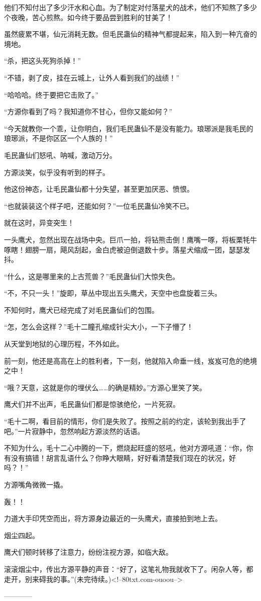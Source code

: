 \begin{this_body}
他们不知付出了多少汗水和心血。为了制定对付落星犬的战术，他们不知熬了多少个夜晚，苦心煎熬。如今终于要品尝到胜利的甘美了！

虽然疲累不堪，仙元消耗无数。但毛民蛊仙的精神气都提起来，陷入到一种亢奋的境地。

“杀，把这头死狗杀掉！”

“不错，剥了皮，挂在云城上，让外人看到我们的战绩！”

“哈哈哈。终于要把它击败了。”

“方源你看到了吗？我知道你不甘心，但你又能如何？”

“今天就教你一个乖，让你明白，我们毛民蛊仙不是没有能力。琅琊派是我毛民的琅琊派，不是你区区一个人族的！”

毛民蛊仙们怒吼、呐喊，激动万分。

方源淡笑，似乎没有听到的样子。

他这份神态，让毛民蛊仙都十分失望，甚至更加厌恶、愤恨。

“也就装装这个样子吧，还能如何？”一位毛民蛊仙冷笑不已。

就在这时，异变突生！

一头鹰犬，忽然出现在战场中央。巨爪一拍，将钻熊击倒！鹰嘴一啄，将板栗牦牛啄瞎！翅膀一扇，飓风刮起，金白虎被迫倒退数十步。落星犬缩成一团，瑟瑟发抖。

“什么，这是哪里来的上古荒兽？”毛民蛊仙们大惊失色。

“不，不只一头！”旋即，草丛中现出五头鹰犬，天空中也盘旋着三头。

不知何时，鹰犬已经完成了对毛民蛊仙们的包围。

“怎，怎么会这样？”毛十二瞳孔缩成针尖大小，一下子懵了！

从天堂到地狱的心理历程，不外如此。

前一刻，他还是高高在上的胜利者，下一刻，他就陷入命垂一线，岌岌可危的绝境之中！

“哦？天意，这就是你的埋伏么……的确是精妙。”方源心里笑了笑。

鹰犬们并不出声，毛民蛊仙们都是惊骇绝伦，一片死寂。

“毛十二啊，看目前的情形，你们是失败了。按照之前的约定，该轮到我出手了吧。”一片寂静中，忽然响起方源淡然的话语。

不知为什么，毛十二心中腾的一下，燃烧起旺盛的怒吼，他对方源吼道：“你，你有没有搞错！胡言乱语什么？你睁大眼睛，好好看清楚我们现在的状况，好吗？！”

方源嘴角微微一撬。

轰！！

力道大手印凭空而出，将方源身边最近的一头鹰犬，直接拍到地上去。

烟尘四起。

鹰犬们顿时转移了注意力，纷纷注视方源，如临大敌。

滚滚烟尘中，传出方源平静的声音：“好了，这笔礼物我就收下了。闲杂人等，都走开，别来碍我的事。”(未完待续。)<!--80txt.com-ouoou-->

------------

\end{this_body}

